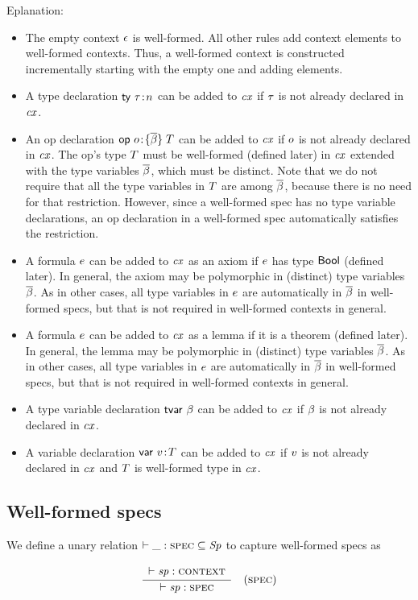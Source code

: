 Eplanation:
\begin{itemize}
\item
The empty context $\epsilon$ is well-formed. All other rules add context elements
to well-formed contexts. Thus, a well-formed context is constructed
incrementally starting with the empty one and adding elements.
\item
A type declaration $\mathsf{ty}\ \tau\!:\!n$ can be added to $\mathit{cx}$ if $\tau$ is not already
declared in $\mathit{cx}$.
\item
An op declaration $\mathsf{op}\ o\!:\!\{\overline{\beta}\}\;T$ can be added to $\mathit{cx}$ if $o$ is not already
declared in $\mathit{cx}$. The op's type $T$ must be well-formed (defined later) in
$\mathit{cx}$ extended with the type variables $\overline{\beta}$, which must be distinct. Note
that we do not require that all the type variables in $T$ are among
$\overline{\beta}$, because there is no need for that restriction. However, since a
well-formed spec has no type variable declarations, an op declaration in a
well-formed spec automatically satisfies the restriction.
\item
A formula $e$ can be added to $\mathit{cx}$ as an axiom if $e$ has type
$\mathsf{Bool}$ (defined later). In general, the axiom may be polymorphic in
(distinct) type variables $\overline{\beta}$. As in other cases, all type variables in
$e$ are automatically in $\overline{\beta}$ in well-formed specs, but that is not
required in well-formed contexts in general.
\item
A formula $e$ can be added to $\mathit{cx}$ as a lemma if it is a theorem (defined
later). In general, the lemma may be polymorphic in (distinct) type variables
$\overline{\beta}$. As in other cases, all type variables in $e$ are automatically
in $\overline{\beta}$ in well-formed specs, but that is not required in well-formed
contexts in general.
\item
A type variable declaration $\mathsf{tvar}\ \beta$ can be added to $\mathit{cx}$ if $\beta$ is not
already declared in $\mathit{cx}$.
\item
A variable declaration $\mathsf{var}\ v\!:\!T$ can be added to $\mathit{cx}$ if $v$ is not already
declared in $\mathit{cx}$ and $T$ is well-formed type in $\mathit{cx}$.
\end{itemize}

\subsection{Well-formed specs}

We define a unary relation $\vdash\_:\textsc{spec}\subseteq\mathit{Sp}$ to capture well-formed
specs as

\[
\frac{\begin{array}{c}\vdash\mathit{sp}:\textsc{context}\end{array}}{\vdash\mathit{sp}:\textsc{spec}}\quad\mbox{(\textsc{spec})}
\]

